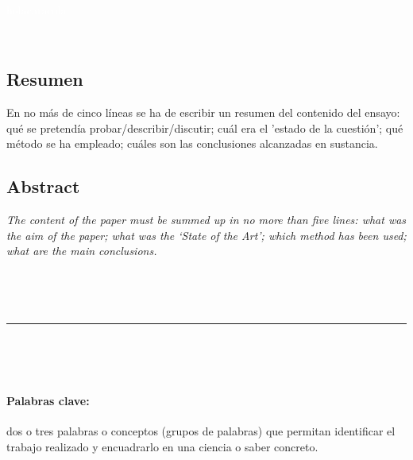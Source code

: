 \documentclass[a4paper,12pt]{article}
\newcommand{\vacio}{\textcolor{white}{holacaracola}}
\begin{document}
{%

\newpage

\renewcommand{\headrulewidth}{0.5pt}
\fancyhead[L]{\vacio}

\renewcommand{\footrulewidth}{0.5pt}
\fancyfoot[C]{\vacio}



\

\vacio

\


\subsection*{Resumen}
En no más de cinco líneas se ha de escribir un resumen del contenido del ensayo: qué se pretendía probar/describir/discutir; cuál era el 'estado de la cuestión’; qué método se ha empleado; cuáles son las conclusiones alcanzadas en sustancia.


\subsection*{Abstract}
\textsl{
The content of the paper must be summed up in no more than five lines: what was the aim of the paper; what was the ‘State of the Art’; which method has been used; what are the main conclusions.}

\ %

\

\hrule

\

\


\paragraph{Palabras clave:} dos o tres palabras o conceptos (grupos de palabras) que permitan identificar el trabajo realizado y encuadrarlo en una ciencia o saber concreto.

\


}
\end{document}
